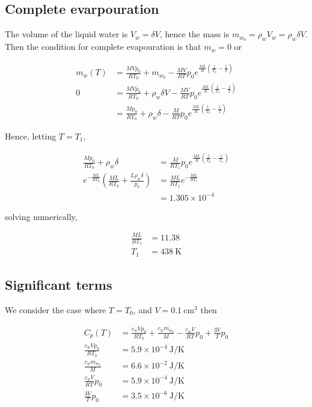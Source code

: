 \documentclass{article}
\begin{document}
\subsection{Complete evarpouration}

The volume of the liquid water is $V_w = \delta V$, hence the mass is $m_{w_0} = \rho_w V_w = \rho_w \delta V$. Then the condition for complete evapouration is that $m_w = 0$ or

\begin{align*}
m_w(T) &= \frac{MVp_0}{RT_0} + m_{w_0} - \frac{MV}{RT}p_0 e^{\frac{ML}{R}\left(\frac{1}{T_0} - \frac{1}{T}\right)} \\
0 &= \frac{MVp_0}{RT_0} + \rho_w \delta V - \frac{MV}{RT}p_0 e^{\frac{ML}{R}\left(\frac{1}{T_0} - \frac{1}{T}\right)} \\
&= \frac{Mp_0}{RT_0} + \rho_w \delta - \frac{M}{RT}p_0 e^{\frac{ML}{R}\left(\frac{1}{T_0} - \frac{1}{T}\right)}
\end{align*}

Hence, letting $T = T_1$,

\begin{align*}
\frac{Mp_0}{RT_0} + \rho_w \delta &= \frac{M}{RT_1}p_0 e^{\frac{ML}{R}\left(\frac{1}{T_0} - \frac{1}{T_1}\right)} \\
e^{-\frac{ML}{RT_0}} \left( \frac{ML}{RT_0} + \frac{L \rho_w \delta}{p_0}\right) &= \frac{ML}{RT_1} e^{-\frac{ML}{RT_1}} \\
&= 1.305 \times 10^{-4}
\end{align*}

solving numerically,

\begin{align*}
\frac{ML}{RT_1} &= 11.38 \\
T_1 &= 438\mathrm{\ K}
\end{align*}

\subsection{Significant terms}

We consider the case where $T = T_0$, and $V = 0.1 \mathrm{\ cm^3}$ then

\begin{align*}
C_p(T) &= \frac{c_wVp_0}{RT_0} + \frac{c_w m_{w_0}}{M} - \frac{c_w V}{RT}p_0 + \frac{3V}{T}p_0 \\
\frac{c_wVp_0}{RT_0} &= 5.9 \times 10^{-4} \mathrm{\ J/K} \\
\frac{c_w m_{w_0}}{M} &= 6.6 \times 10^{-2} \mathrm{\ J/K} \\
\frac{c_w V}{RT}p_0 &= 5.9 \times 10^{-4} \mathrm{\ J/K} \\
\frac{3V}{T}p_0 &= 3.5 \times 10^{-6} \mathrm{\ J/K}
\end{align*}
\end{document}
